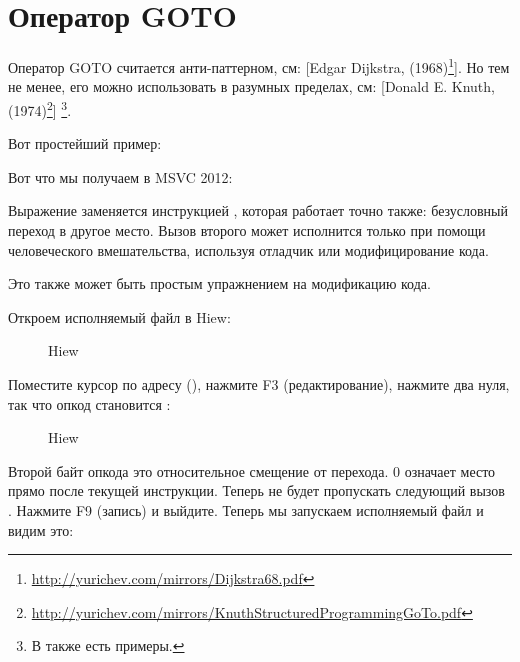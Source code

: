 \section{Оператор GOTO}

Оператор GOTO считается анти-паттерном, см:
[Edgar Dijkstra,  (1968)\footnote{\url{http://yurichev.com/mirrors/Dijkstra68.pdf}}].
Но тем не менее, его можно использовать в разумных пределах, см:
[Donald E. Knuth,  (1974)\footnote{\url{http://yurichev.com/mirrors/KnuthStructuredProgrammingGoTo.pdf}}]
\footnote{В \InSqBrackets{\CNotes} также есть примеры.}.

Вот простейший пример:



Вот что мы получаем в MSVC 2012:



Выражение  заменяется инструкцией \JMP, которая работает точно также: безусловный переход в другое место.
Вызов второго \printf может исполнится только при помощи человеческого вмешательства, используя отладчик или модифицирование кода.

\par

\clearpage
Это также может быть простым упражнением на модификацию кода.

Откроем исполняемый файл в Hiew:

\begin{figure}[H]
\centering
{}
\caption{Hiew}
\label{fig:goto_hiew1}
\end{figure}

\clearpage
Поместите курсор по адресу \JMP (), 
нажмите F3 (редактирование), нажмите два нуля, так что
опкод становится :

\begin{figure}[H]
\centering
{}
\caption{Hiew}
\label{fig:goto_hiew2}
\end{figure}

Второй байт опкода \JMP это относительное смещение от перехода. 0 означает место
прямо после текущей инструкции.
Теперь \JMP не будет пропускать следующий вызов \printf.
Нажмите F9 (запись) и выйдите.
Теперь мы запускаем исполняемый файл и видим это:

